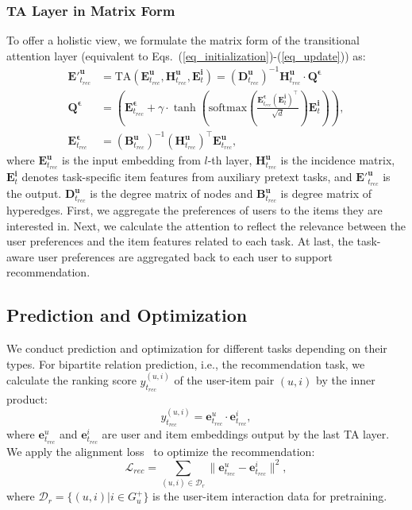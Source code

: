 \subsubsection{TA Layer in Matrix Form}
To offer a holistic view, we formulate the matrix form of the transitional attention layer (equivalent to Eqs.~(\ref{eq_initialization})-(\ref{eq_update})) as:
\begin{equation}\label{ta}
\begin{aligned}
    \mathbf{E'}^{\mathbf{u}}_{t_{rec}}
    &= \text{TA}(\mathbf{E}^{\mathbf{u}}_{t_{rec}},\mathbf{H}^{\mathbf{u}}_{t_{rec}},\mathbf{E}^{\mathbf{i}}_{t})
    =(\mathbf{D}^{\mathbf{u}}_{t_{rec}})^{-1}\mathbf{H}^{\mathbf{u}}_{t_{rec}}\cdot\mathbf{Q}^{\mathbf{\epsilon}}\\ 
    \mathbf{Q}^{\mathbf{\epsilon}}&= (\mathbf{E}^{\mathbf{\epsilon}}_{t_{rec}} + \gamma\cdot\tanh(\text{softmax}(\frac{\mathbf{E}^{\mathbf{\epsilon}}_{t_{rec}}(\mathbf{E}^{\mathbf{i}}_{t})^\top}{\sqrt{d}})\mathbf{E}^{\mathbf{i}}_{t})),\\
    \mathbf{E}^{\mathbf{\epsilon}}_{t_{rec}} &= (\mathbf{B}^{\mathbf{u}}_{t_{rec}})^{-1}(\mathbf{H}^{\mathbf{u}}_{t_{rec}})^\top\mathbf{E}^{\mathbf{u}}_{t_{rec}},
\end{aligned}
\end{equation}
where $\mathbf{E}^{\mathbf{u}}_{t_{rec}}$ is the input embedding from $l$-th layer, $\mathbf{H}^{\mathbf{u}}_{t_{rec}}$ is the incidence matrix, $\mathbf{E}^{\mathbf{i}}_{t}$ denotes task-specific item features from auxiliary pretext tasks, and $\mathbf{E'}^{\mathbf{u}}_{t_{rec}}$ is the output. $\mathbf{D}^{\mathbf{u}}_{t_{rec}}$ is the degree matrix of nodes and $\mathbf{B}^{\mathbf{u}}_{t_{rec}}$ is degree matrix of hyperedges. First, we aggregate the preferences of users to the items they are interested in. Next, we calculate the attention to reflect the relevance between the user preferences and the item features related to each task. At last, the task-aware user preferences are aggregated back to each user to support recommendation.

\subsection{Prediction and Optimization}
We conduct prediction and optimization for different tasks depending on their types. For bipartite relation prediction, i.e., the recommendation task, we calculate the ranking score ${y}^{(u,i)}_{t_{rec}}$ of the user-item pair $(u,i)$ by the inner product: 
\begin{equation}
{y}^{(u,i)}_{t_{rec}} = \mathbf{e}^{u}_{t_{rec}}\cdot \mathbf{e}^{i}_{t_{rec}},
\end{equation}
where $\mathbf{e}^{u}_{t_{rec}}$ and $\mathbf{e}^{i}_{t_{rec}}$ are user and item embeddings output by the last TA layer. We apply the alignment loss~\cite{auloss} to optimize the recommendation:
\begin{equation}
\mathcal{L}_{rec}=\sum\limits_{(u,i)\in \mathcal{D}_r} \|\mathbf{e}^{u}_{t_{rec}}-\mathbf{e}^{i}_{t_{rec}}\|^{2},
\end{equation}
where $\mathcal{D}_r=\{(u,i)|i\in G^{+}_{u}\}$ is the user-item interaction data for pretraining. 

